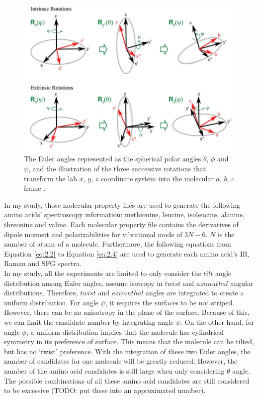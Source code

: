 \begin{figure}[!ht] \label{fig:2.1}
\centering
\includegraphics[scale=0.5]{Figures/Euler_angles_represented_as_the_spherical_polar_angles.png} 
\caption{The Euler angles represented as the spherical polar angles $\theta$, $\phi$ and $\psi$, and the illustration of the three successive rotations that transform the lab $x$, $y$, $z$ coordinate system into the molecular $a$, $b$, $c$ frame \cite{hore0033-rotations}. }
\end{figure}

In my study, those molecular property files are used to generate the following amino acids' spectroscopy information: methionine, leucine, isoleucine, alanine, threonine and valine. Each molecular property file contains the derivatives of dipole moment and polarizabilities for vibrational mode of $3N-6$. $N$ is the number of atoms of a molecule. Furthermore, the following equations from Equation \ref{eq:2.2} to Equation \ref{eq:2.4} are used to generate each amino acid's IR, Raman and SFG spectra. \\

In my study, all the experiments are limited to only consider the $tilt$ angle distribution among Euler angles, assume isotropy in $twist$ and $azimuthal$ angular distributions. Therefore, $twist$ and $azimuthal$ angles are integrated to create a uniform distribution. For angle $\psi$, it requires the surfaces to be not striped. However, there can be no anisotropy in the plane of the surface. Because of this, we can limit the candidate number by integrating angle $\psi$. On the other hand, for angle $\phi$, a uniform distribution implies that the molecule has cylindrical symmetry in its preference of surface. This means that the molecule can be tilted, but has no `twist' preference. With the integration of these two Euler angles, the number of candidates for one molecule will be greatly reduced. However, the number of the amino acid candidates is still large when only considering $\theta$ angle. The possible combinations of all these amino acid candidates are still considered to be excessive (TODO: put these into an approximated number). \\

